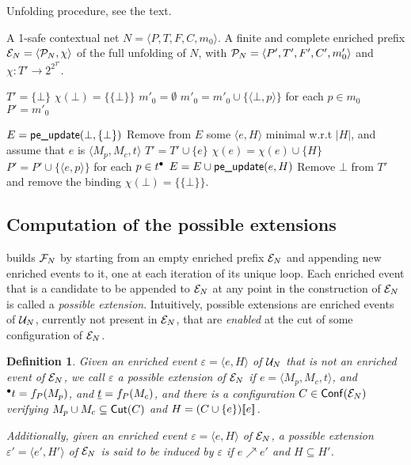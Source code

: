 \documentclass[11pt,a4paper]{article}
\newtheorem{definition}[theorem]{Definition}
\newcommand{\conf}[1]{\ensuremath{\mathsf{Conf}(#1)}}
\newcommand{\peupdate}{\mbox{\sf pe\_update}}
\newcommand{\iscutoff}{\mbox{\sf is\_cutoff}}
\begin{document}
\begin{algorithm}
\caption{Unfolding procedure, see the text.}
\label{alg:unfolding.procedure}

\begin{algorithmic}
\REQUIRE A 1-safe contextual net $N = \langle P, T, F, C, m_0 \rangle$.
\ENSURE A finite and complete enriched prefix $\mathcal{E}_{N} = \langle \mathcal{P}_{N}, \chi
\rangle$ of the full unfolding of $N$, with $\mathcal{P}_{N} = \langle P', T', F', C',
m'_0 \rangle$ and $\chi : T' \to 2^{2^{T'}}$.

\vspace{1ex}
\STATE $T' = \{\bot\}$
\STATE $\chi (\bot) = \{\{\bot\}\}$
\STATE $m'_0 = \emptyset$
\STATE $m'_0 = m'_0 \cup \{\langle \bot, p \rangle\}$ for each $p \in m_0$
\STATE $P' = m'_0$

\STATE $E = \peupdate (\bot, \{\bot\})$
\STATE Remove from $E$ some $\langle e, H \rangle$ minimal w.r.t $|H|$, and
assume that $e$ is $\langle M_p, M_c, t \rangle$
\IF{not $\iscutoff (e, H)$}
\STATE $T' = T' \cup \{e\}$
\STATE $\chi(e) = \chi(e) \cup \{H\}$
\STATE $P' = P' \cup \{\langle e, p \rangle\}$ for each $p \in t^\bullet$
\STATE $E = E \cup \peupdate (e, H)$
\ENDIF
\ENDWHILE
\STATE Remove $\bot$ from $T'$ and remove the binding $\chi (\bot) =
\{\{\bot\}\}$.
\end{algorithmic}
\end{algorithm}

\subsection{Computation of the possible extensions}
\label{sec:computation.possible}

 builds $\mathcal{F}_{N}$ by starting from an empty enriched
prefix $\mathcal{E}_{N}$ and appending new enriched events to it, one at each iteration
of its unique loop.  Each enriched event that is a candidate to be appended to
$\mathcal{E}_{N}$ at any point in the construction of $\mathcal{E}_{N}$ is called a
\emph{possible extension}.  Intuitively, possible extensions are enriched
events of $\mathcal{U}_{N}$, currently not present in $\mathcal{E}_{N}$, that are \emph{enabled}
at the cut of some configuration of $\mathcal{E}_{N}$.

\begin{definition}
\label{def:possible.extension}
Given an enriched event $\varepsilon = \langle e, H \rangle$ of $\mathcal{U}_{N}$ that
is not an enriched event of $\mathcal{E}_{N}$, we call $\varepsilon$ a \emph{possible
extension} of $\mathcal{E}_{N}$ if $e = \langle M_p, M_c, t \rangle$, and ${}^\bullet t = f_P
(M_p)$, and $\underline{t} = f_P (M_c)$, and there is a configuration $C \in
\conf{\enr N}$ verifying $M_p \cup M_c \subseteq \mathsf{Cut }{(C)}$ and $H = (C \cup
\{e\}) [\![ e]\!]$.

Additionally, given an enriched event $\varepsilon = \langle e, H \rangle$ of
$\mathcal{E}_{N}$, a possible extension $\varepsilon' = \langle e', H' \rangle$ of $\mathcal{E}_{N}$ is said to be \emph{induced by} $\varepsilon$ if $e \nearrow e'$ and $H
\subseteq H'$.
\end{definition}
\end{document}
